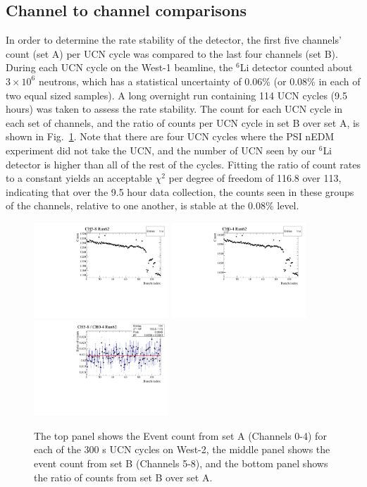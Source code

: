 \documentclass[letter,twocolumn,preprint,3p,numbers,sort&compress]{elsarticle}
\begin{document}
\subsection{ Channel to channel comparisons }

In order to determine the rate stability of the detector, the first
five channels' count (set A) per UCN cycle was compared to the last
four channels (set B).  During each UCN cycle on the West-1 beamline,
the $^6$Li detector counted about $3\times10^6$ neutrons, which has a
statistical uncertainty of 0.06\% (or 0.08\% in each of two equal
sized samples).  A long overnight run containing 114 UCN cycles (9.5
hours) was taken to assess the rate stability.  The count for each UCN
cycle in each set of channels, and the ratio of counts per UCN cycle
in set B over set A, is shown in Fig.~\ref{fig:ratiocount}.  Note that
there are four UCN cycles where the PSI nEDM experiment did not take
the UCN, and the number of UCN seen by our $^6$Li detector is higher
than all of the rest of the cycles.  Fitting the ratio of count rates
to a constant yields an acceptable $\chi^2$ per degree of freedom of
116.8 over 113, indicating that over the 9.5 hour data collection, the
counts seen in these groups of the channels, relative to one another,
is stable at the 0.08\% level.

\begin{figure}[!htpb]
\centering
\includegraphics[width=0.45\textwidth]{figures/ratestab_ch04_Run62.pdf}
\includegraphics[width=0.45\textwidth]{figures/ratestab_ch58_Run62.pdf}
\includegraphics[width=0.45\textwidth]{figures/ratestab_ratio_Run62.pdf}
\caption{ The top panel shows the Event count from set A (Channels
  0-4) for each of the 300 s UCN cycles on West-2, the middle panel
  shows the event count from set B (Channels 5-8), and the bottom
  panel shows the ratio of counts from set B over set A.}
\label{fig:ratiocount}
\end{figure}
\end{document}
